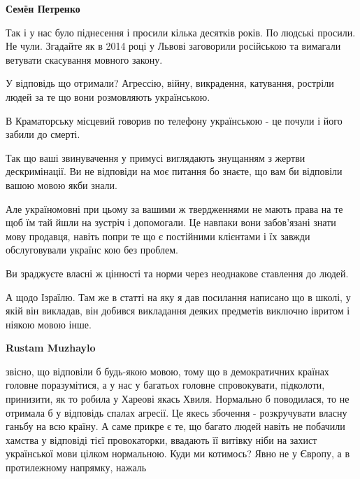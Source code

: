 \begin{itemize}
\begin{itemize}
\textbf{Семён Петренко}

Так і у нас було піднесення і просили кілька десятків років. По людські
просили. Не чули. Згадайте як в 2014 році у Львові заговорили російською та
вимагали ветувати скасування мовного закону.

У відповідь що отримали? Агрессію, війну, викрадення, катування, ростріли людей
за те що вони розмовляють українською.

В Краматорську місцевий говорив по телефону українською - це почули і його
забили до смерті.

Так що ваші звинувачення у примусі виглядають знущанням з жертви дескримінації.
Ви не відповіди на моє питання бо знаєте, що вам би відповіли вашою мовою якби
знали.

Але україномовні при цьому за вашими ж твердженнями не мають права на те щоб їм
тай йшли на зустріч і допомогали. Це навпаки вони забов'язані знати мову
продавця, навіть попри те що є постійними клієнтами і їх завжди обслуговували
українс кою без проблем.

Ви зраджуєте власні ж цінності та норми через неоднакове ставлення до людей.

А щодо Ізраїлю. Там же в статті на яку я дав посилання написано що в школі, у
якій він викладав, він добився викладання деяких предметів виключно івритом і
ніякою мовою інше.

 
\textbf{Rustam Muzhaylo} 

звісно, що відповіли б будь-якою мовою, тому що в демократичних країнах головне
поразумітися, а у нас у багатьох головне спровокувати, підколоти, принизити, як
то робила у Хареові якась Хвиля. Нормально б поводилася, то не отримала б у
відповідь спалах агресії. Це якесь збочення - розкручувати власну ганьбу на всю
країну. А саме прикре є те, що багато людей навіть не побачили хамства у
відповіді тієї провокаторки, ввадають її витівку ніби на захист української
мови цілком нормальною. Куди ми котимось? Явно не у Європу, а в протилежному
напрямку, нажаль

 

\end{itemize}
\end{itemize}
